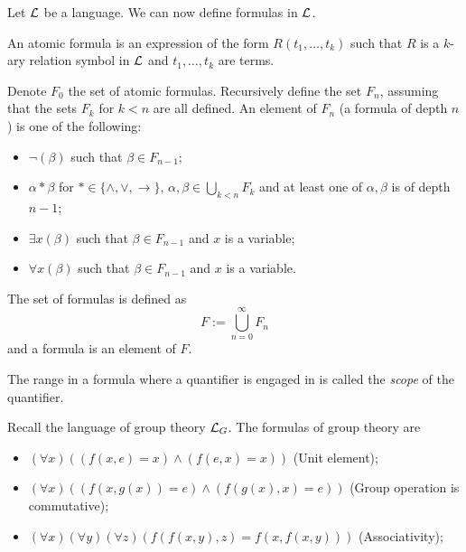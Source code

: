 \documentclass[11pt,a4paper]{article}
\renewcommand{\implies}{\rightarrow}
\begin{document}
  Let $\mathcal{L}$ be a language. We can now define formulas in $\mathcal{L}$.

  \begin{definition}
    An atomic formula is an expression of the form $R(t_1,\dots,t_k)$ such
    that $R$ is a $k$-ary relation symbol in $\mathcal{L}$ and $t_1,\dots,t_k$ are
    terms.
  \end{definition}
  
  \begin{definition}[Formula]
    Denote $F_0$ the set of atomic formulas.
    Recursively define the set $F_n$, assuming that the sets $F_k$ for $k < n$
    are all defined.
    An element of $F_n$ (a formula of depth $n$) is one of the following:
    \begin{itemize}
      \item $\neg (\beta)$ such that $\beta \in F_{n-1}$;
      \item $\alpha * \beta$ for $* \in \{\land, \lor, \implies\}$,
        $\alpha,\beta \in \bigcup_{k < n} F_k$ and at least one of 
        $\alpha,\beta$ is of depth $n-1$;
      \item $\exists x(\beta)$ such that $\beta \in F_{n-1}$ and $x$ is
        a variable;
      \item $\forall x(\beta)$ such that $\beta \in F_{n-1}$ and $x$ is
        a variable.
    \end{itemize}
    The set of formulas is defined as
    \[
      F := \bigcup_{n=0}^{\infty} F_n
    \]
    and a formula is an element of $F$.
  \end{definition}

  \begin{remark}
    The range in a formula where a quantifier is engaged in is called the
    \emph{scope} of the quantifier.
  \end{remark}

  \begin{example}
    Recall the language of group theory $\mathcal{L}_G$.
    The formulas of group theory are
    \begin{itemize}
      \item $(\forall x)((f(x,e) = x) \land (f(e,x) = x))$ (Unit element);
      \item $(\forall x)((f(x,g(x)) = e) \land (f(g(x),x) = e))$
        (Group operation is commutative);
      \item $(\forall x)(\forall y)(\forall z)
        (f(f(x,y),z) = f(x,f(x,y)))$ (Associativity);
    \end{itemize}
  \end{example}
\end{document}
